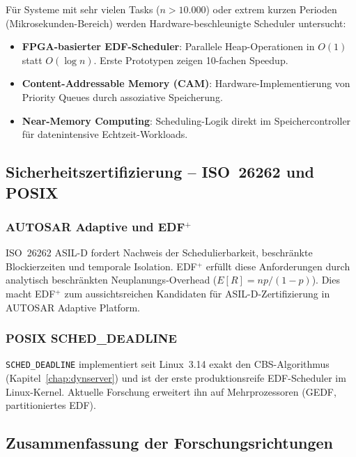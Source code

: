 ﻿\documentclass[a4paper,12pt]{report}
\theoremstyle{definition}
\begin{document}
Für Systeme mit sehr vielen Tasks ($n > 10.000$) oder extrem kurzen Perioden
(Mikrosekunden-Bereich) werden Hardware-beschleunigte Scheduler untersucht:

\begin{itemize}
	\item \textbf{FPGA-basierter EDF-Scheduler}: Parallele Heap-Operationen
	      in $O(1)$ statt $O(\log n)$. Erste Prototypen zeigen 10-fachen
	      Speedup.
	\item \textbf{Content-Addressable Memory (CAM)}: Hardware-Implementierung
	      von Priority Queues durch assoziative Speicherung.
	\item \textbf{Near-Memory Computing}: Scheduling-Logik direkt im
	      Speichercontroller für datenintensive Echtzeit-Workloads.
\end{itemize}

\subsection{Sicherheitszertifizierung -- ISO~26262 und POSIX}

\subsubsection{AUTOSAR Adaptive und EDF$^+$}

ISO~26262 ASIL-D fordert Nachweis der Schedulierbarkeit, beschränkte
Blockierzeiten und temporale Isolation. EDF$^+$ \cite{Epp2026} erfüllt diese
Anforderungen durch analytisch beschränkten Neuplanungs-Overhead
($E[R] = np/(1-p)$). Dies macht EDF$^+$ zum aussichtsreichen Kandidaten
für ASIL-D-Zertifizierung in AUTOSAR Adaptive Platform.

\subsubsection{POSIX SCHED\_DEADLINE}

\texttt{SCHED\_DEADLINE} implementiert seit Linux~3.14 exakt den CBS-Algorithmus
(Kapitel~\ref{chap:dynserver}) und ist der erste produktionsreife EDF-Scheduler
im Linux-Kernel. Aktuelle Forschung erweitert ihn auf Mehrprozessoren
(GEDF, partitioniertes EDF).

\subsection{Zusammenfassung der Forschungsrichtungen}
\end{document}
